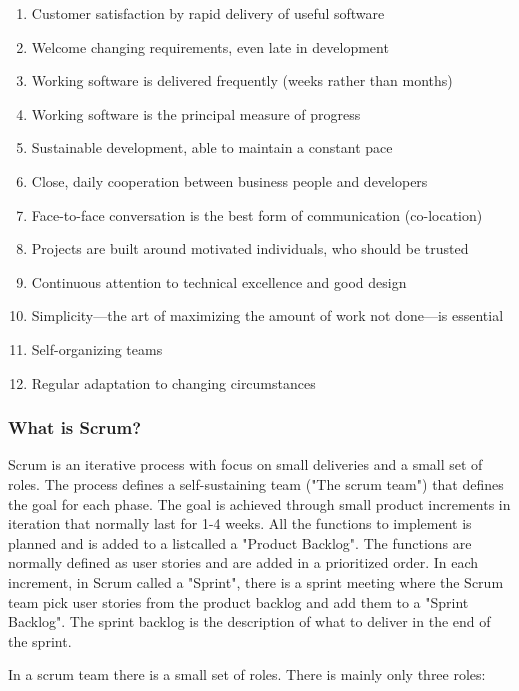 \begin{enumerate}
    \item Customer satisfaction by rapid delivery of useful software
    \item Welcome changing requirements, even late in development
    \item Working software is delivered frequently (weeks rather than months)
    \item Working software is the principal measure of progress
    \item Sustainable development, able to maintain a constant pace
    \item Close, daily cooperation between business people and developers
    \item Face-to-face conversation is the best form of communication (co-location)
    \item Projects are built around motivated individuals, who should be trusted
    \item Continuous attention to technical excellence and good design
    \item Simplicity—the art of maximizing the amount of work not done—is essential
    \item Self-organizing teams
    \item Regular adaptation to changing circumstances
\end{enumerate}

\subsubsection{What is Scrum?}

Scrum is an iterative process with focus on small deliveries and a small set of roles. 
The process defines a self-sustaining team ("The scrum team") that defines the goal for each phase. The goal 
is achieved through small product increments in iteration that normally last for 1-4 weeks. 
All the functions to implement is planned and is added to a listcalled a "Product Backlog". The
functions are normally defined as user stories and are added in a prioritized order. In each increment, 
in Scrum called a "Sprint", there is a sprint meeting where the Scrum team pick user stories from the 
product backlog and add them to a "Sprint Backlog". The sprint backlog is the description of what 
to deliver in the end of the sprint.

In a scrum team there is a small set of roles. There is mainly only three roles: 

